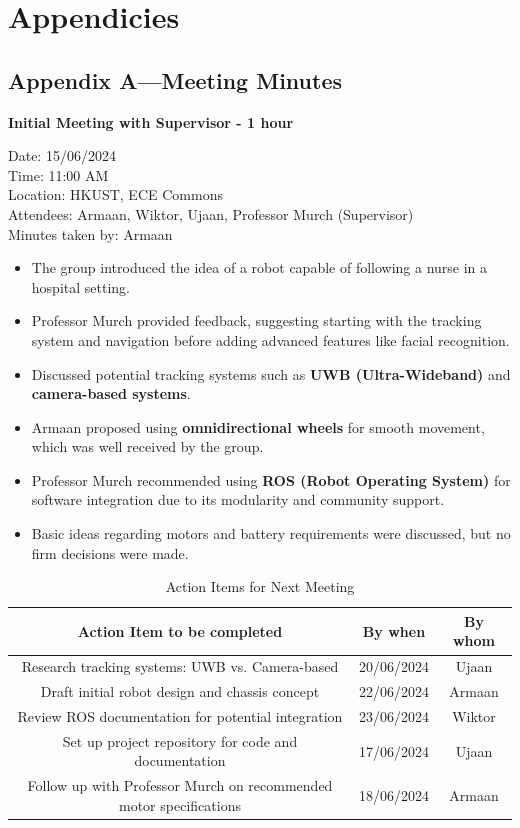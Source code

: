 \documentclass{article}
\begin{document}
\newpage
\section*{Appendicies}
{}

\subsection*{Appendix A—Meeting Minutes}

\textbf{Initial Meeting with Supervisor - 1 hour}

Date: 15/06/2024 \\
Time: 11:00 AM \\
Location: HKUST, ECE Commons \\
Attendees: Armaan, Wiktor, Ujaan, Professor Murch (Supervisor) \\
Minutes taken by: Armaan

\begin{itemize}
    \item The group introduced the idea of a robot capable of following a nurse in a hospital setting.
    \item Professor Murch provided feedback, suggesting starting with the tracking system and navigation before adding advanced features like facial recognition.
    \item Discussed potential tracking systems such as \textbf{UWB (Ultra-Wideband)} and \textbf{camera-based systems}.
    \item Armaan proposed using \textbf{omnidirectional wheels} for smooth movement, which was well received by the group.
    \item Professor Murch recommended using \textbf{ROS (Robot Operating System)} for software integration due to its modularity and community support.
    \item Basic ideas regarding motors and battery requirements were discussed, but no firm decisions were made.
\end{itemize}

\begin{table}[h]
    \centering
    \begin{tabular}{|c|c|c|}
        \hline
        \textbf{Action Item to be completed} & \textbf{By when} & \textbf{By whom} \\
        \hline
        Research tracking systems: UWB vs. Camera-based & 20/06/2024 & Ujaan \\
        \hline
        Draft initial robot design and chassis concept & 22/06/2024 & Armaan \\
        \hline
        Review ROS documentation for potential integration & 23/06/2024 & Wiktor \\
        \hline
        Set up project repository for code and documentation & 17/06/2024 & Ujaan \\
        \hline
        Follow up with Professor Murch on recommended motor specifications & 18/06/2024 & Armaan \\
        \hline
    \end{tabular}
    \caption{Action Items for Next Meeting}
    \label{tab:action_items_next_1}
\end{table}
\end{document}
